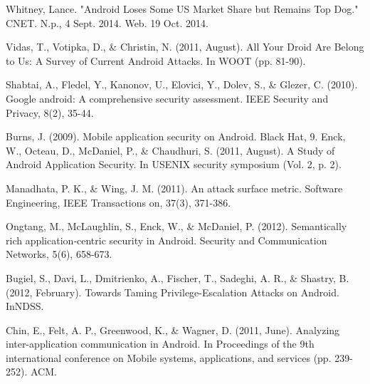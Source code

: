 \documentclass[conference]{IEEEtran}
\begin{document}

%
%
%
\begin{thebibliography}{1}

Whitney, Lance. "Android Loses Some US Market Share but Remains Top Dog." CNET. N.p., 4 Sept. 2014. Web. 19 Oct. 2014.

Vidas, T., Votipka, D., \& Christin, N. (2011, August). All Your Droid Are Belong to Us: A Survey of Current Android Attacks. In WOOT (pp. 81-90).

Shabtai, A., Fledel, Y., Kanonov, U., Elovici, Y., Dolev, S., \& Glezer, C. (2010). Google android: A comprehensive security assessment. IEEE Security and Privacy, 8(2), 35-44.

Burns, J. (2009). Mobile application security on Android. Black Hat, 9.
Enck, W., Octeau, D., McDaniel, P., \& Chaudhuri, S. (2011, August). A Study of Android Application Security. In USENIX security symposium (Vol. 2, p. 2).

Manadhata, P. K., \& Wing, J. M. (2011). An attack surface metric. Software Engineering, IEEE Transactions on, 37(3), 371-386.

Ongtang, M., McLaughlin, S., Enck, W., \& McDaniel, P. (2012). Semantically rich application‐centric security in Android. Security and Communication Networks, 5(6), 658-673.

Bugiel, S., Davi, L., Dmitrienko, A., Fischer, T., Sadeghi, A. R., \& Shastry, B. (2012, February). Towards Taming Privilege-Escalation Attacks on Android. InNDSS.

Chin, E., Felt, A. P., Greenwood, K., \& Wagner, D. (2011, June). Analyzing inter-application communication in Android. In Proceedings of the 9th international conference on Mobile systems, applications, and services (pp. 239-252). ACM.


\end{thebibliography}
\end{document}

